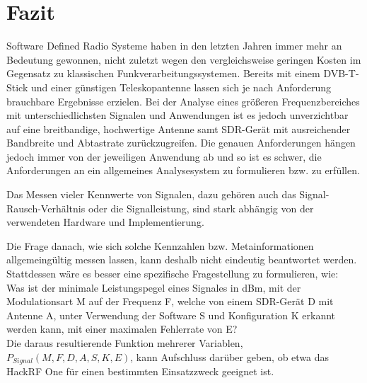 
\chapter{Fazit}
Software Defined Radio Systeme haben in den letzten Jahren immer mehr an Bedeutung gewonnen, nicht zuletzt wegen den vergleichsweise geringen Kosten im Gegensatz zu klassischen Funkverarbeitungssystemen.
Bereits mit einem DVB-T-Stick und einer günstigen Teleskopantenne lassen sich je nach Anforderung brauchbare Ergebnisse erzielen. Bei der Analyse eines größeren Frequenzbereiches mit unterschiedlichsten Signalen und Anwendungen ist es jedoch unverzichtbar auf eine breitbandige, hochwertige Antenne samt SDR-Gerät mit ausreichender Bandbreite und Abtastrate zurückzugreifen. Die genauen Anforderungen hängen jedoch immer von der jeweiligen Anwendung ab und so ist es schwer, die Anforderungen an ein allgemeines Analysesystem zu formulieren bzw. zu erfüllen.

Das Messen vieler Kennwerte von Signalen, dazu gehören auch das Signal-Rausch-Verhältnis oder die Signalleistung, sind stark abhängig von der verwendeten Hardware und Implementierung.

Die Frage danach, wie sich solche Kennzahlen bzw. Metainformationen allgemeingültig messen lassen, kann deshalb nicht eindeutig beantwortet werden.
Stattdessen wäre es besser eine spezifische Fragestellung zu formulieren, wie: \\
Was ist der minimale Leistungspegel eines Signales in dBm, mit der Modulationsart M auf der Frequenz F, welche von einem SDR-Gerät D mit Antenne A, unter Verwendung der Software S und Konfiguration K erkannt werden kann, mit einer maximalen Fehlerrate von E?\\
Die daraus resultierende Funktion mehrerer Variablen, \(P_{Signal} (M, F, D, A, S, K, E)\), kann Aufschluss darüber geben, ob etwa das HackRF One für einen bestimmten Einsatzzweck geeignet ist.


